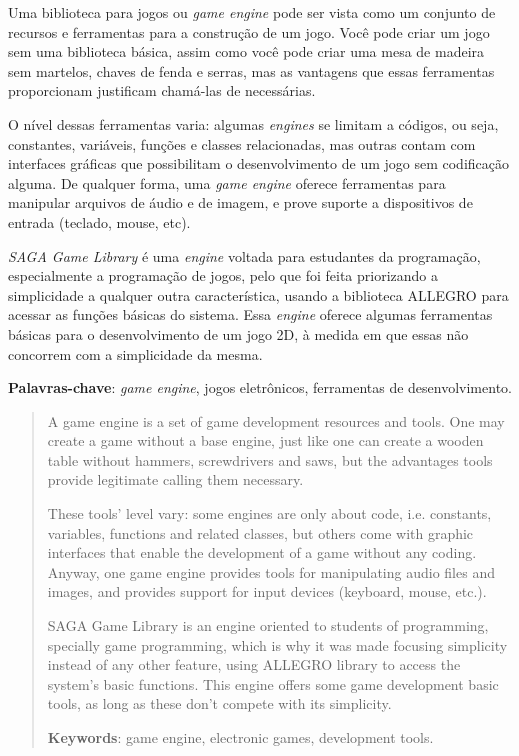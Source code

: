 \begin{resumo}

Uma biblioteca para jogos ou \textit{game engine} pode ser vista como um conjunto de recursos e ferramentas para a construção de um jogo. Você pode criar um jogo sem uma biblioteca básica, assim como você pode criar uma mesa de madeira sem martelos, chaves de fenda e serras, mas as vantagens que essas ferramentas proporcionam justificam chamá-las de necessárias.

O nível dessas ferramentas varia: algumas \textit{engines} se limitam a códigos, ou seja, constantes, variáveis, funções e classes relacionadas, mas outras contam com interfaces gráficas que possibilitam o desenvolvimento de um jogo sem codificação alguma. De qualquer forma, uma \textit{game engine} oferece ferramentas para manipular arquivos de áudio e de imagem, e prove suporte a dispositivos de entrada (teclado, mouse, etc).

\textit{SAGA Game Library} é uma \textit{engine} voltada para estudantes da programação, especialmente a programação de jogos, pelo que foi feita priorizando a simplicidade a qualquer outra característica, usando a biblioteca ALLEGRO para acessar as funções básicas do sistema. Essa \textit{engine} oferece algumas ferramentas básicas para o desenvolvimento de um jogo 2D, à medida em que essas não concorrem com a simplicidade da mesma.

\vspace{1em}
\textbf{Palavras-chave}: \textit{game engine}, jogos eletrônicos, ferramentas de desenvolvimento.
\end{resumo}

\begin{abstract}
%
A game engine is a set of game development resources and tools. One may create a game without a base engine, just like one can create a wooden table without hammers, screwdrivers and saws, but the advantages tools provide legitimate calling them necessary.

These tools’ level vary: some engines are only about code, i.e. constants, variables, functions and related classes, but others come with graphic interfaces that enable the development of a game without any coding. Anyway, one game engine provides tools for manipulating audio files and images, and provides support for input devices (keyboard, mouse, etc.).

SAGA Game Library is an engine oriented to students of programming, specially game programming, which is why it was made focusing simplicity instead of any other feature, using ALLEGRO library to access the system's basic functions. This engine offers some game development basic tools, as long as these don't compete with its simplicity.

\vspace{2em}
\textbf{Keywords}: game engine, electronic games, development tools.
\end{abstract}
